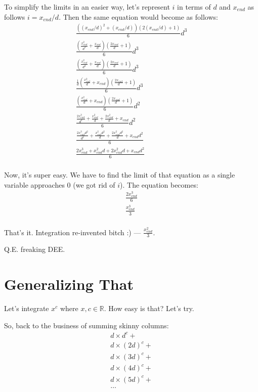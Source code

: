 \documentclass{report}
\begin{document}
To simplify the limits in an easier way, let's represent $i$ in terms of $d$
and $x_{end}$ as follows $i = x_{end}/d$. Then the same equation would become
as follows:
\[\begin{split}
  \frac{((x_{end}/d)^2+(x_{end}/d))(2(x_{end}/d)+1)}{6}d^3\\
  \frac{(\frac{x_{end}^2}{d^2}+\frac{x_{end}}{d})(\frac{2x_{end}}{d}+1)}{6}d^3\\
  \frac{(\frac{x_{end}^2}{d^2}+\frac{x_{end}}{d})(\frac{2x_{end}}{d}+1)}{6}d^3\\
  \frac{\frac{1}{d}(\frac{x_{end}^2}{d}+x_{end})(\frac{2x_{end}}{d}+1)}{6}d^3\\
  \frac{(\frac{x_{end}^2}{d}+x_{end})(\frac{2x_{end}}{d}+1)}{6}d^2\\
  \frac{\frac{2x_{end}^3}{d^2} +  \frac{x_{end}^2}{d} +  \frac{2x_{end}^2}{d} + x_{end}}{6}d^2\\
  \frac{\frac{2x_{end}^3d^2}{d^2} +  \frac{x_{end}^2d^2}{d} +  \frac{2x_{end}^2d^2}{d} + x_{end}d^2}{6}\\
  \frac{2x_{end}^3 +  x_{end}^2d +  2x_{end}^2d + x_{end}d^2}{6}\\
\end{split}\]

Now, it's super easy. We have to find the limit of that equation as a single
variable approaches 0 (we got rid of $i$). The equation becomes:
\[\begin{split}
  \frac{2x_{end}^3}{6}\\
  \frac{x_{end}^3}{3}\\
\end{split}\]

That's it. Integration re-invented bitch :) --- $\frac{x_{end}^2}3$.

Q.E. freaking DEE.


    \section{Generalizing That}
    Let's integrate $x^c$ where $x, c \in \mathbb{R}$. How easy is that? Let's
    try.

    So, back to the business of summing skinny columns:
    \[\begin{split}
        d \times d^c + \\
        d \times (2d)^c + \\
        d \times (3d)^c + \\
        d \times (4d)^c + \\
        d \times (5d)^c + \\
        \ldots
    \end{split}\]
\end{document}
